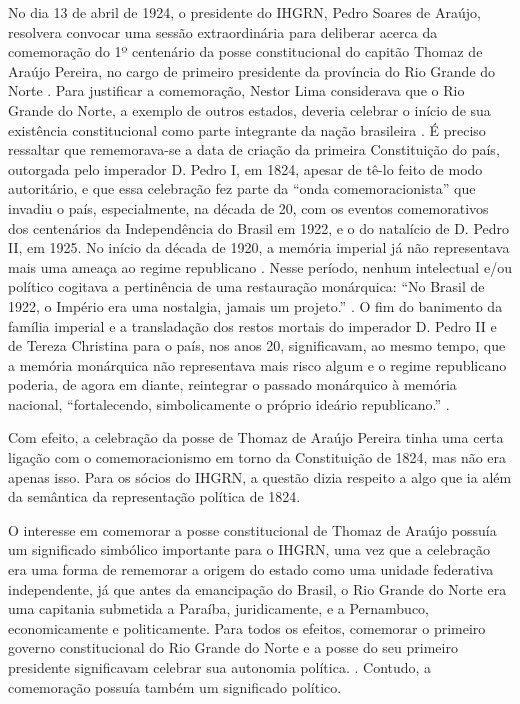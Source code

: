 \begin{refsection}
    No dia 13 de abril de 1924, o presidente do IHGRN, Pedro Soares de Araújo, resolvera convocar uma sessão extraordinária para deliberar acerca da comemoração do 1º centenário da posse constitucional do capitão Thomaz de Araújo Pereira, no cargo de primeiro presidente da província do Rio Grande do Norte \cite[p.~264]{ActaSessao1925}. Para justificar a comemoração, Nestor Lima considerava que o Rio Grande do Norte, a exemplo de outros estados, deveria celebrar o início de sua existência constitucional como parte integrante da nação brasileira \cite[p.~265]{ActaSessao1925}. É preciso ressaltar que rememorava-se a data de criação da primeira Constituição do país, outorgada pelo imperador D. Pedro I, em 1824, apesar de tê-lo feito de modo autoritário, e que essa celebração fez parte da ``onda comemoracionista'' que invadiu o país, especialmente, na década de 20, com os eventos comemorativos dos centenários da Independência do Brasil em 1922, e o do natalício de D. Pedro II, em 1925. No início da década de 1920, a memória imperial já não representava mais uma ameaça ao regime republicano \cite{Rodrigues2013Releitura}. Nesse período, nenhum intelectual e/ou político cogitava a pertinência de uma restauração monárquica: ``No Brasil de 1922, o Império era uma nostalgia, jamais um projeto.'' \cite[p.~339]{Enders2014Vultos}. O fim do banimento da família imperial e a transladação dos restos mortais do imperador D. Pedro II e de Tereza Christina para o país, nos anos 20, significavam, ao mesmo tempo, que a memória monárquica não representava mais risco algum e o regime republicano poderia, de agora em diante, reintegrar o passado monárquico à memória nacional, ``fortalecendo, simbolicamente o próprio ideário republicano.'' \cite[p.~193]{Sandes2000Invencao}.

    Com efeito, a celebração da posse de Thomaz de Araújo Pereira tinha uma certa ligação com o comemoracionismo em torno da Constituição de 1824, mas não era apenas isso. Para os sócios do IHGRN, a questão dizia respeito a algo que ia além da semântica da representação política de 1824.  

    O interesse em comemorar a posse constitucional de Thomaz de Araújo possuía um significado simbólico importante para o IHGRN, uma vez que a celebração era uma forma de rememorar a origem do estado como uma unidade federativa independente, já que antes da emancipação do Brasil, o Rio Grande do Norte era uma capitania submetida a Paraíba, juridicamente, e a Pernambuco, economicamente e politicamente. Para todos os efeitos, comemorar o primeiro governo constitucional do Rio Grande do Norte e a posse do seu primeiro presidente significavam celebrar sua autonomia política. \cite[p.~176]{DiscursoManoealDantas}. Contudo, a comemoração possuía também um significado político.


\end{refsection}
